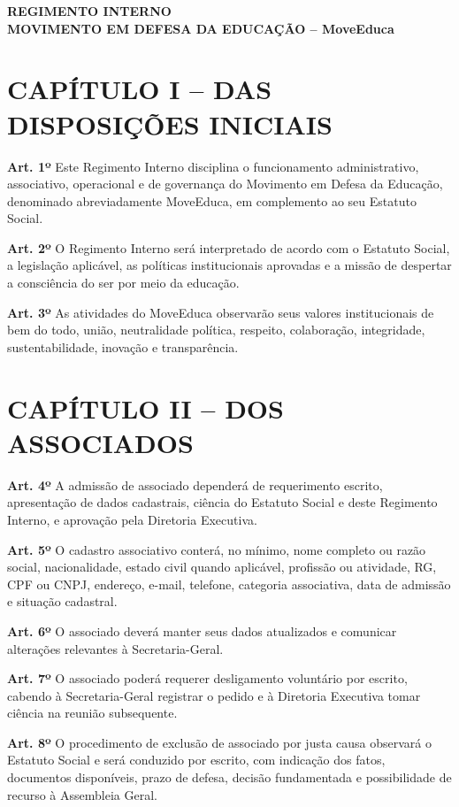\documentclass[11pt,a4paper]{article}
\begin{document}
\begin{center}
\textbf{\Large REGIMENTO INTERNO}\\
\textbf{\large MOVIMENTO EM DEFESA DA EDUCAÇÃO -- MoveEduca}
\end{center}

\section*{CAPÍTULO I -- DAS DISPOSIÇÕES INICIAIS}

\textbf{Art. 1º} Este Regimento Interno disciplina o funcionamento administrativo, associativo, operacional e de governança do Movimento em Defesa da Educação, denominado abreviadamente MoveEduca, em complemento ao seu Estatuto Social.

\textbf{Art. 2º} O Regimento Interno será interpretado de acordo com o Estatuto Social, a legislação aplicável, as políticas institucionais aprovadas e a missão de despertar a consciência do ser por meio da educação.

\textbf{Art. 3º} As atividades do MoveEduca observarão seus valores institucionais de bem do todo, união, neutralidade política, respeito, colaboração, integridade, sustentabilidade, inovação e transparência.

\section*{CAPÍTULO II -- DOS ASSOCIADOS}

\textbf{Art. 4º} A admissão de associado dependerá de requerimento escrito, apresentação de dados cadastrais, ciência do Estatuto Social e deste Regimento Interno, e aprovação pela Diretoria Executiva.

\textbf{Art. 5º} O cadastro associativo conterá, no mínimo, nome completo ou razão social, nacionalidade, estado civil quando aplicável, profissão ou atividade, RG, CPF ou CNPJ, endereço, e-mail, telefone, categoria associativa, data de admissão e situação cadastral.

\textbf{Art. 6º} O associado deverá manter seus dados atualizados e comunicar alterações relevantes à Secretaria-Geral.

\textbf{Art. 7º} O associado poderá requerer desligamento voluntário por escrito, cabendo à Secretaria-Geral registrar o pedido e à Diretoria Executiva tomar ciência na reunião subsequente.

\textbf{Art. 8º} O procedimento de exclusão de associado por justa causa observará o Estatuto Social e será conduzido por escrito, com indicação dos fatos, documentos disponíveis, prazo de defesa, decisão fundamentada e possibilidade de recurso à Assembleia Geral.
\end{document}
